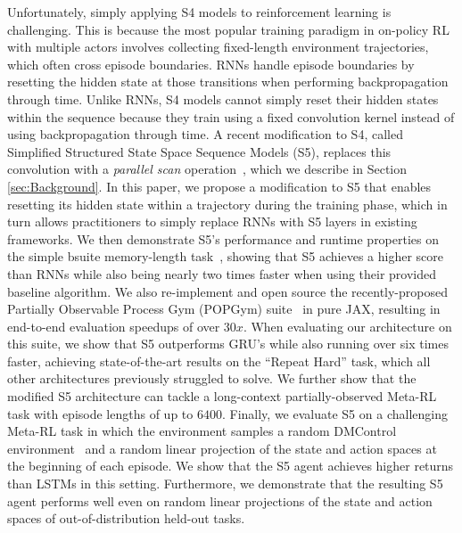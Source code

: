 \documentclass{article}
\begin{document}
Unfortunately, simply applying S4 models to reinforcement learning is challenging. This is because the most popular training paradigm in on-policy RL with multiple actors involves collecting fixed-length environment trajectories, which often cross episode boundaries. RNNs handle episode boundaries by resetting the hidden state at those transitions when performing backpropagation through time. Unlike RNNs, S4 models cannot simply reset their hidden states within the sequence because they train using a fixed convolution kernel instead of using backpropagation through time.
A recent modification to S4, called Simplified Structured State Space Sequence Models (S5), replaces this convolution with a \textit{parallel scan} operation~\citep{smith2022simplified}, which we describe in Section \ref{sec:Background}. In this paper, we propose a modification to S5 that enables resetting its hidden state within a trajectory during the training phase, which in turn allows practitioners to simply replace RNNs with S5 layers in existing frameworks. We then demonstrate S5's performance and runtime properties on the simple bsuite memory-length task~\citep{osband2019behaviour}, showing that S5 achieves a higher score than RNNs while also being nearly two times faster when using their provided baseline algorithm.
We also re-implement and open source the recently-proposed Partially Observable Process Gym (POPGym) suite~\citep{morad2023popgym} in pure JAX, resulting in end-to-end evaluation speedups of over $30x$. When evaluating our architecture on this suite, we show that S5 outperforms GRU's while also running over six times faster, achieving state-of-the-art results on the ``Repeat Hard'' task, which all other architectures previously struggled to solve.
We further show that the modified S5 architecture can tackle a long-context partially-observed Meta-RL task with episode lengths of up to $6400$. Finally, we evaluate S5 on a challenging Meta-RL task in which the environment samples a random DMControl environment~\citep{tassa2018deepmind} and a random linear projection of the state and action spaces at the beginning of each episode. We show that the S5 agent achieves higher returns than LSTMs in this setting. Furthermore, we demonstrate that the resulting S5 agent performs well even on random linear projections of the state and action spaces of out-of-distribution held-out tasks.
\end{document}
